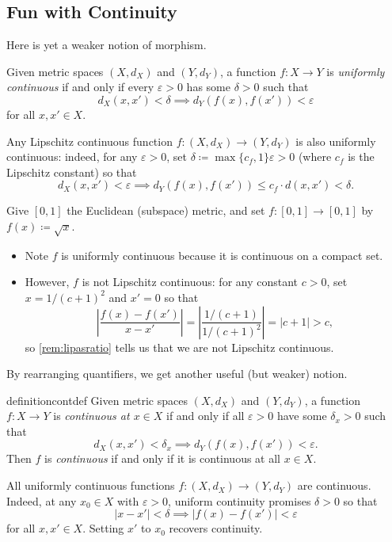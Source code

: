 \documentclass[../notes.tex]{subfiles}
\begin{document}
\subsection{Fun with Continuity}
Here is yet a weaker notion of morphism.
\begin{defihelper} 
	Given metric spaces $(X,d_X)$ and $(Y,d_Y)$, a function $f\colon X\to Y$ is \textit{uniformly continuous} if and only if every $\varepsilon>0$ has some $\delta>0$ such that
	\[d_X(x,x')<\delta\implies d_Y(f(x),f(x'))<\varepsilon\]
	for all $x,x'\in X$.
\end{defihelper}
\begin{example}
	Any Lipschitz continuous function $f\colon(X,d_X)\to(Y,d_Y)$ is also uniformly continuous: indeed, for any $\varepsilon>0$, set $\delta\coloneqq\max\{c_f,1\}\varepsilon>0$ (where $c_f$ is the Lipschitz constant) so that
	\[d_X(x,x')<\varepsilon\implies d_Y(f(x),f(x'))\le c_f\cdot d(x,x')<\delta.\]
\end{example}
\begin{example}
	Give $[0,1]$ the Euclidean (subspace) metric, and set $f\colon[0,1]\to[0,1]$ by $f(x)\coloneqq\sqrt x$.
	\begin{itemize}
		\item Note $f$ is uniformly continuous because it is continuous on a compact set.
		\item However, $f$ is not Lipschitz continuous: for any constant $c>0$, set $x=1/(c+1)^2$ and $x'=0$ so that
		\[\left|\frac{f(x)-f(x')}{x-x'}\right|=\left|\frac{1/(c+1)}{1/(c+1)^2}\right|=|c+1|>c,\]
		so \autoref{rem:lipasratio} tells us that we are not Lipschitz continuous.
	\end{itemize}
\end{example}
By rearranging quantifiers, we get another useful (but weaker) notion.
\begin{restatable}[Continuous]{definition}{contdef}
	Given metric spaces $(X,d_X)$ and $(Y,d_Y)$, a function $f\colon X\to Y$ is \textit{continuous at $x\in X$} if and only if all $\varepsilon>0$ have some $\delta_x>0$ such that
	\[d_X(x,x')<\delta_x\implies d_Y(f(x),f(x'))<\varepsilon.\]
	Then $f$ is \textit{continuous} if and only if it is continuous at all $x\in X$.
\end{restatable}
\begin{example}
	All uniformly continuous functions $f\colon(X,d_X)\to(Y,d_Y)$ are continuous. Indeed, at any $x_0\in X$ with $\varepsilon>0$, uniform continuity promises $\delta>0$ so that
	\[|x-x'|<\delta\implies|f(x)-f(x')|<\varepsilon\]
	for all $x,x'\in X$. Setting $x'$ to $x_0$ recovers continuity.
\end{example}
\end{document}
